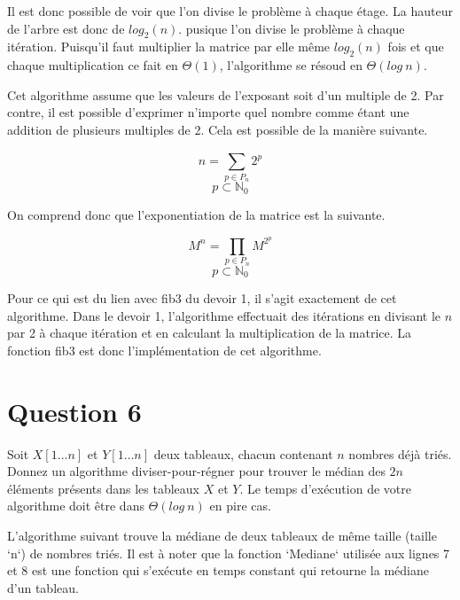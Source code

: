\documentclass[12pt]{article}
\begin{document}
 Il est donc possible de voir que l'on divise le problème à chaque étage. La hauteur de l'arbre est donc de \( log_2 (n) \). pusique l'on divise le problème à chaque itération. Puisqu'il faut multiplier la matrice par elle même \( log_2 (n) \) fois et que chaque multiplication ce fait en \(\Theta (1) \), l'algorithme se résoud en \(\Theta (log \: n)\). \newline

Cet algorithme assume que les valeurs de l'exposant soit d'un multiple de 2. Par contre, il est possible d'exprimer n'importe quel nombre comme étant une addition de plusieurs multiples de 2. Cela est possible de la manière suivante.

\[ n = \sum_{p \in P_n}^{} 2^p \]
\[ p \subset \mathbb{N}_0 \]

On comprend donc que l'exponentiation de la matrice est la suivante.

\[ M^n = \prod_{p \in P_n}^{} M^{2^p} \]
\[ p \subset \mathbb{N}_0 \]

Pour ce qui est du lien avec fib3 du devoir 1, il s'agit exactement de cet algorithme. Dans le devoir 1, l'algorithme effectuait des itérations en divisant le \( n \) par 2 à chaque itération et en calculant la multiplication de la matrice. La fonction fib3 est donc l'implémentation de cet algorithme.

\newpage

\section*{Question 6}
Soit \(X[1 \dots n]\) et \(Y [1 \dots n]\) deux tableaux, chacun contenant \(n\) nombres déjà triés. Donnez un algorithme diviser-pour-régner pour trouver le médian des \(2n\) éléments présents dans les tableaux \(X\) et \(Y\). Le temps d’exécution de votre algorithme doit être dans \(\Theta (log \: n)\) en pire cas.

\begin{flushleft}
L'algorithme suivant trouve la médiane de deux tableaux de même taille (taille `n`) de nombres triés. Il est à noter que la fonction `Mediane` utilisée aux lignes 7 et 8 est une fonction qui s'exécute en temps constant qui retourne la médiane d'un tableau.
\end{flushleft}
\end{document}

